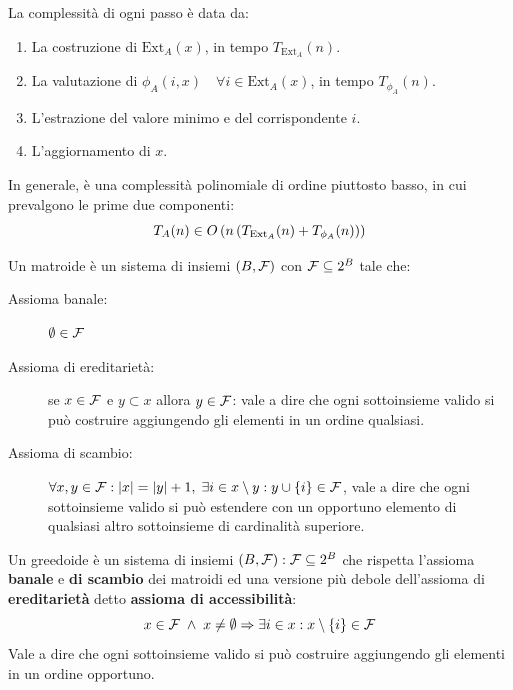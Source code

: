 \documentclass[\main/main.tex]{subfiles}
\begin{document}
\begin{complexity}
    La complessità di ogni passo è data da:
    \begin{enumerate}
        \item La costruzione di \(\text{Ext}_A(x)\), in tempo \(T_{\text{Ext}_A}(n)\).
        \item La valutazione di \(\phi_A(i, x) \quad \forall i \in \text{Ext}_A(x)\), in tempo \(T_{\phi_A}(n)\).
        \item L'estrazione del valore minimo e del corrispondente \(i\).
        \item L'aggiornamento di \(x\).
    \end{enumerate}
    In generale, è una complessità polinomiale di ordine piuttosto basso, in cui prevalgono le prime due componenti:
    \[
        T_A(n) \in O\left(n\left(T_{\text{Ext}_A}(n) + T_{\phi_A}(n)\right)\right)
    \]
\end{complexity}
\begin{definition}[Matroide]
Un matroide è un sistema di insiemi \(\left(B, \mathcal{F}\right)\) con \(\mathcal{F} \subseteq 2^{B}\) tale che:
\begin{description}
    \item[Assioma banale:] \(\emptyset \in \mathcal{F}\)
    \item[Assioma di ereditarietà:] se \(x \in \mathcal{F}\) e \(y \subset x\) allora \(y \in \mathcal{F}\): vale a dire che ogni sottoinsieme valido si può costruire aggiungendo gli elementi in un ordine qualsiasi.
    \item[Assioma di scambio:] \( \forall x, y \in \mathcal{F}: \left\lvert x\right\rvert = \left\lvert y\right\rvert + 1, \; \exists i \in x \setminus y: y \cup \left\{i\right\} \in \mathcal{F} \), vale a dire che ogni sottoinsieme valido si può estendere con un opportuno elemento di qualsiasi altro sottoinsieme di cardinalità superiore.
\end{description}
\end{definition}
\begin{definition}[Greedoide]
Un greedoide è un sistema di insiemi \(\left(B, \mathcal{F}\right): \mathcal{F} \subseteq 2^B\) che rispetta l'assioma \textbf{banale} e \textbf{di scambio} dei matroidi ed una versione più debole dell'assioma di \textbf{ereditarietà} detto \textbf{assioma di accessibilità}:
\[
    x \in \mathcal{F} \; \land \; x \neq \emptyset \Rightarrow \exists i \in x: x \setminus \left\{i\right\} \in \mathcal{F}
\]
Vale a dire che ogni sottoinsieme valido si può costruire aggiungendo gli elementi in un ordine opportuno.
\end{definition}
\clearpage
\end{document}
